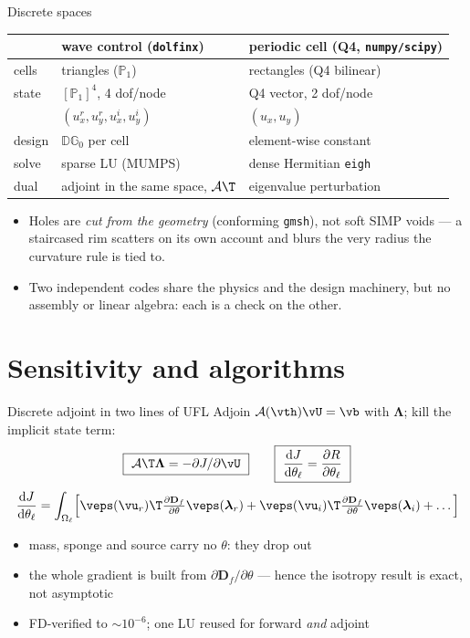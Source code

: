 \documentclass[aspectratio=169,10pt]{beamer}
\begin{document}
\begin{frame}{Discrete spaces}
\centering\small
\begin{tabular}{lll}
\toprule
& wave control (\texttt{dolfinx}) & periodic cell (Q4, \texttt{numpy/scipy})\\
\midrule
cells       & triangles ($\mathbb P_1$)      & rectangles (Q4 bilinear)\\
state       & $[\mathbb P_1]^4$, 4 dof/node  & Q4 vector, 2 dof/node\\
            & $(u^r_x,u^r_y,u^i_x,u^i_y)$    & $(u_x,u_y)$\\
design      & $\mathbb{DG}_0$ per cell       & element-wise constant\\
solve       & sparse LU (MUMPS)              & dense Hermitian \texttt{eigh}\\
dual        & adjoint in the same space, $\mathcal A\T$ & eigenvalue perturbation\\
\bottomrule
\end{tabular}
\vfill
\begin{itemize}
  \item Holes are \emph{cut from the geometry} (conforming \texttt{gmsh}), not
        soft SIMP voids --- a staircased rim scatters on its own account and
        blurs the very radius the curvature rule is tied to.
  \item Two independent codes share the physics and the design machinery, but
        no assembly or linear algebra: each is a check on the other.
\end{itemize}
\end{frame}

\section{Sensitivity and algorithms}

\begin{frame}{Discrete adjoint in two lines of UFL}
Adjoin $\mathcal A(\vth)\vU=\vb$ with $\bm\Lambda$; kill the implicit state term:
\[
  \boxed{\ \mathcal A\T\bm\Lambda=-\partial J/\partial\vU\ }
  \qquad
  \boxed{\ \frac{\mathrm dJ}{\mathrm d\theta_\ell}=\frac{\partial R}{\partial\theta_\ell}\ }
\]
\[
  \frac{\mathrm dJ}{\mathrm d\theta_\ell}
  =\int_{\Omega_\ell}\Bigl[\veps(\vu_r)\T\tfrac{\partial\mathbf D_f}{\partial\theta}\veps(\bm\lambda_r)
  +\veps(\vu_i)\T\tfrac{\partial\mathbf D_f}{\partial\theta}\veps(\bm\lambda_i)+\dots\Bigr]
\]
\begin{itemize}
  \item mass, sponge and source carry no $\theta$: they drop out
  \item the whole gradient is built from $\partial\mathbf D_f/\partial\theta$
        --- hence the isotropy result is exact, not asymptotic
  \item FD-verified to $\sim\!10^{-6}$; one LU reused for forward \emph{and} adjoint
\end{itemize}
\end{frame}
\end{document}
